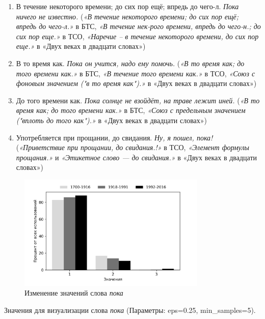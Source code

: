 \documentclass[LI,VKR]{HSEUniversity}
\begin{document}
\begin{enumerate}
    \item В течение некоторого времени; до сих пор ещё; впредь до чего-л. \textit{Пока ничего не известно.}
(\textit{«В течение некоторого времени; до сих пор ещё; впредь до чего-л.»} в БТС,
\textit{«В течение нек-рого времени, впредь до чего-н.; до сих пор еще.»} в ТСО,
\textit{«Наречие – в течение некоторого времени, до сих пор еще.»} в «Двух веках в двадцати словах»)

    \item В то время как. \textit{Пока он учится, надо ему помочь.}
(\textit{«В то время как; до того времени как.»} в БТС,
\textit{«В течение того времени как.»} в ТСО,
\textit{«Союз с фоновым значением ("в то время как").»} в «Двух веках в двадцати словах»)

    \item До того времени как. \textit{Пока солнце не взойдёт, на траве лежит иней.}
(\textit{«В то время как; до того времени как.»} в БТС,
\textit{«Союз с предельным значением ("вплоть до того как").»} в «Двух веках в двадцати словах»)

    \item Употребляется при прощании, до свидания. \textit{Ну, я пошел, пока!}
(\textit{«Приветствие при прощании, до свидания.!»} в ТСО,
\textit{«Элемент формулы прощания.»} и \textit{«Этикетное слово — до свидания.»} в «Двух веках в двадцати словах»)
\end{enumerate}

\begin{figure}[H]
	\centering
	\includegraphics[width=0.8\textwidth]{img/visualizations/poka_minimal}
	\caption{Изменение значений слова \textit{пока}}
	\label{fig:Пока}
\end{figure}

Значения для визуализации слова \textit{пока} (Параметры: eps=0.25, min\_samples=5).
\end{document}
